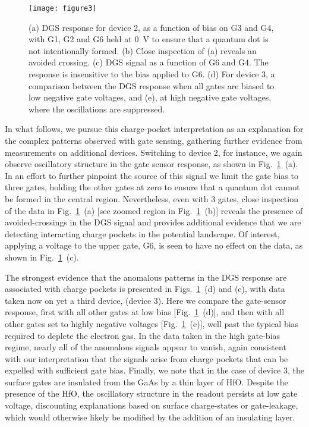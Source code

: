 \begin{figure}
\texttt{[image: figure3]}
\caption{\label{fig:pock_fig3} (a) DGS response for device 2, as a function of bias on G3 and G4, with G1, G2 and G6 held at \SI{0}{\volt} to ensure that a quantum dot is not intentionally formed. (b) Close inspection of (a) reveals an avoided crossing. (c) DGS signal as a function of G6 and G4. The response is insensitive to the bias applied to G6. (d) For device 3, a comparison between the DGS response when all gates are biased to low negative gate voltages, and (e), at high negative gate voltages, where the oscillations are suppressed.}
\end{figure}

In what follows, we pursue this charge-pocket interpretation as an explanation for the complex patterns observed with gate sensing, gathering further evidence from measurements on additional devices.  Switching to device 2, for instance, we again observe oscillatory structure in the gate sensor response, as shown in Fig.~\ref{fig:pock_fig3}~(a). In an effort to further pinpoint the source of this signal we limit the gate bias to three gates, holding the other gates at zero to ensure that a quantum dot cannot be formed in the central region.  Nevertheless, even with 3 gates, close inspection of the data in Fig.~\ref{fig:pock_fig3}~(a) [see zoomed region in Fig.~\ref{fig:pock_fig3}~(b)] reveals the presence of avoided-crossings in the DGS signal and provides additional evidence that we are detecting interacting charge pockets in the potential landscape. Of interest, applying a voltage to the upper gate, G6, is seen to have no effect on the data, as shown in Fig.~\ref{fig:pock_fig3}~(c).

The strongest evidence that the anomalous patterns in the DGS response are associated with charge pockets is presented in Figs.~\ref{fig:pock_fig3}~(d) and (e), with data taken now on yet a third device, (device 3). Here we compare the gate-sensor response, first with all other gates at low bias [Fig.~\ref{fig:pock_fig3}~(d)], and then with all other gates set to highly negative voltages [Fig.~\ref{fig:pock_fig3}~(e)], well past the typical bias required to deplete the electron gas. In the data taken in the high gate-bias regime, nearly all of the anomalous signals appear to vanish, again consistent with our interpretation that the signals arise from charge pockets that can be expelled with sufficient gate bias. Finally, we note that in the case of device 3, the surface gates are insulated from the GaAs by a thin layer of HfO. Despite the presence of the HfO, the oscillatory structure in the readout persists at low gate voltage, discounting explanations based on surface charge-states or gate-leakage, which would otherwise likely be modified by the addition of an insulating layer.

